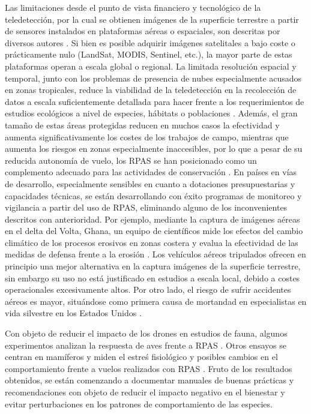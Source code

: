 \documentclass[onecolumn]{extarticle}
\begin{document}
Las limitaciones desde el punto de vista financiero y tecnológico de la
teledetección, por la cual se obtienen imágenes de la superficie
terrestre a partir de sensores instalados en plataformas aéreas o
espaciales, son descritas por diversos autores \citep{Koh2012}. Si bien
es posible adquirir imágenes satelitales a bajo coste o prácticamente
nulo (LandSat, MODIS, Sentinel, etc.), la mayor parte de estas
plataformas operan a escala global o regional. La limitada resolución
espacial y temporal, junto con los problemas de presencia de nubes
especialmente acusados en zonas tropicales, reduce la viabilidad de la
teledetección en la recolección de datos a escala suficientemente
detallada para hacer frente a los requerimientos de estudios ecológicos
a nivel de especies, hábitats o poblaciones \citep{Wulder2004}. Además,
el gran tamaño de estas áreas protegidas reducen en muchos casos la
efectividad y aumenta significativamente los costes de los trabajos de
campo, mientras que aumenta los riesgos en zonas especialmente
inaccesibles, por lo que a pesar de su reducida autonomía de vuelo, los
RPAS se han posicionado como un complemento adecuado para las
actividades de conservación \citep{Zahawi2015}. En países en vías de
desarrollo, especialmente sensibles en cuanto a dotaciones
presupuestarias y capacidades técnicas, se están desarrollando con éxito
programas de monitoreo y vigilancia a partir del uso de RPAS, eliminando
alguno de los inconvenientes descritos con anterioridad. Por ejemplo,
mediante la captura de imágenes aéreas en el delta del Volta, Ghana, un
equipo de científicos mide los efectos del cambio climático de los
procesos erosivos en zonas costera y evalua la efectividad de las
medidas de defensa frente a la erosión \citep{Georg2016}. Los vehículos
aéreos tripulados ofrecen en principio una mejor alternativa en la
captura imágenes de la superficie terrestre, sin embargo su uso no está
justificado en estudios a escala local, debido a costes operacionales
excesivamente altos. Por otro lado, el riesgo de sufrir accidentes
aéreos es mayor, situándose como primera causa de mortandad en
especialistas en vida silvestre en los Estados Unidos \citep{Sasse2003}.

Con objeto de reducir el impacto de los drones en estudios de fauna,
algunos experimentos analizan la respuesta de aves frente a RPAS
\citep{Vas2015}. Otros ensayos se centran en mamíferos y miden el estreś
fisiológico y posibles cambios en el comportamiento frente a vuelos
realizados con RPAS \citep{Ditmer2015}. Fruto de los resultados
obtenidos, se están comenzando a documentar manuales de buenas prácticas
y recomendaciones con objeto de reducir el impacto negativo en el
bienestar y evitar perturbaciones en los patrones de comportamiento de
las especies.
\end{document}
